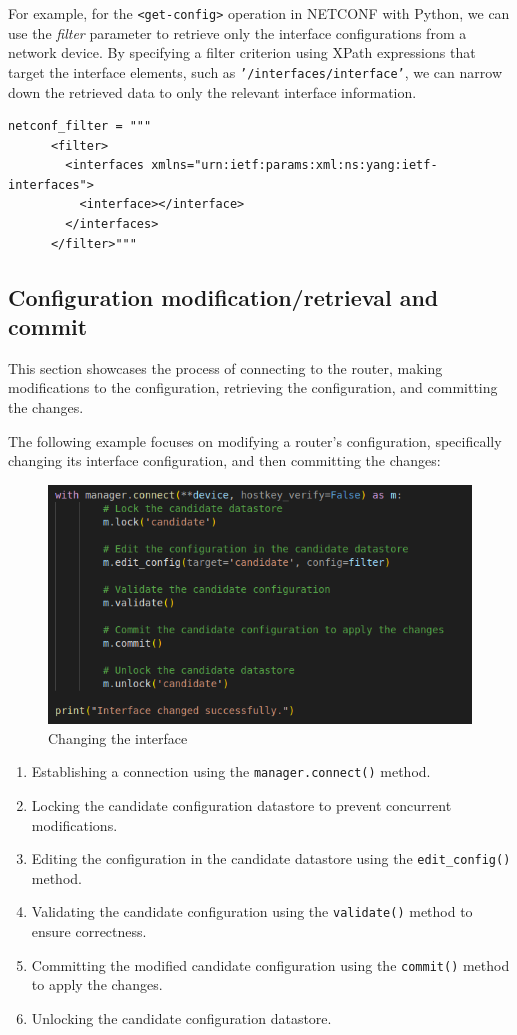 For example, for the \texttt{<get-config>} operation in NETCONF with Python, we can use the \textit{filter} parameter to retrieve only the interface configurations from a network device. By specifying a filter criterion using XPath expressions that target the interface elements, such as \texttt{'/interfaces/interface'}, we can narrow down the retrieved data to only the relevant interface information.

\begin{lstlisting}[style=pythonStyle, caption={Filter for interfaces.}, backgroundcolor=\color{codebackground}]
  netconf_filter = """
      <filter>
        <interfaces xmlns="urn:ietf:params:xml:ns:yang:ietf-interfaces">
          <interface></interface>
        </interfaces>
      </filter>"""          
\end{lstlisting}

\subsection{Configuration modification/retrieval and commit}

This section showcases the process of connecting to the router, making modifications to the configuration, retrieving the configuration, and committing the changes.

The following example focuses on modifying a router's configuration, specifically changing its interface configuration, and then committing the changes:

\begin{figure}[h]
  \centering
  \includegraphics[width=0.7\linewidth]{Images/change_int.png}
  \caption{Changing the interface}
\end{figure}

\begin{enumerate}
  \item Establishing a connection using the \texttt{manager.connect()} method.
  \item Locking the candidate configuration datastore to prevent concurrent modifications.
  \item Editing the configuration in the candidate datastore using the \texttt{edit\_config()} method.
  \item Validating the candidate configuration using the \texttt{validate()} method to ensure correctness.
  \item Committing the modified candidate configuration using the \texttt{commit()} method to apply the changes.
  \item Unlocking the candidate configuration datastore.
\end{enumerate}

